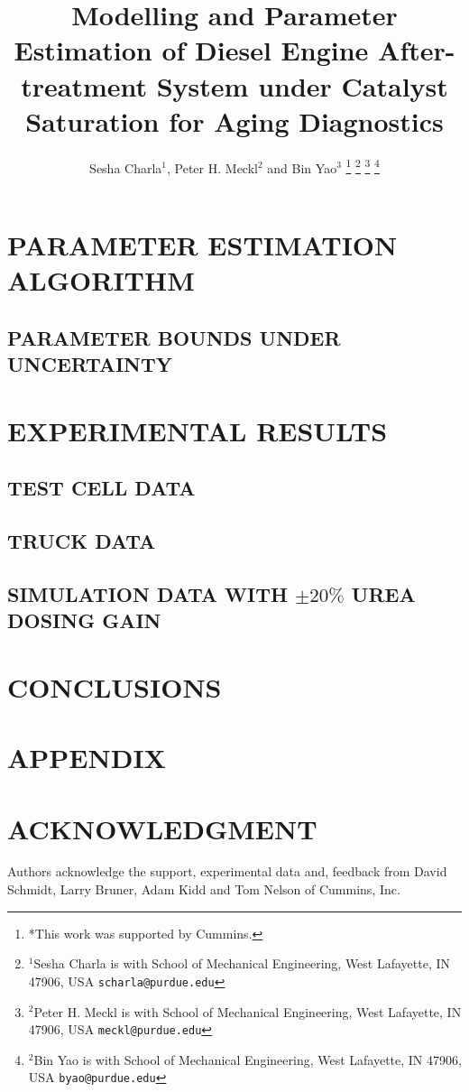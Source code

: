 \documentclass[letterpaper, 10 pt, conference]{ieeeconf}  %
\title{\LARGE \bf
Modelling and Parameter Estimation of Diesel Engine After-treatment System under Catalyst Saturation for Aging Diagnostics
}
\author{Sesha Charla$^{1}$, Peter H. Meckl$^{2}$ and Bin Yao$^{3}$ %
\thanks{*This work was supported by Cummins.}%
\thanks{$^{1}$Sesha Charla is with School of Mechanical Engineering, West Lafayette, IN 47906, USA
        {\tt\small scharla@purdue.edu}}%
\thanks{$^{2}$Peter H. Meckl is with School of Mechanical Engineering, West Lafayette, IN 47906, USA
        {\tt\small meckl@purdue.edu}}%
\thanks{$^{2}$Bin Yao is with School of Mechanical Engineering, West Lafayette, IN 47906, USA
        {\tt\small byao@purdue.edu}}%
}
\begin{document}
\maketitle
\thispagestyle{empty}
\pagestyle{empty}


\begin{abstract}

\end{abstract}





\section{PARAMETER ESTIMATION ALGORITHM}
\subsection{PARAMETER BOUNDS UNDER UNCERTAINTY}

\section{EXPERIMENTAL RESULTS}
\subsection{TEST CELL DATA}
\subsection{TRUCK DATA}
\subsection{SIMULATION DATA WITH $\pm 20\%$ UREA DOSING GAIN}

\section{CONCLUSIONS}


\section*{APPENDIX}

\section*{ACKNOWLEDGMENT}
Authors acknowledge the support, experimental data and, feedback from David Schmidt, Larry
Bruner, Adam Kidd and Tom Nelson of Cummins, Inc.



\end{document}
